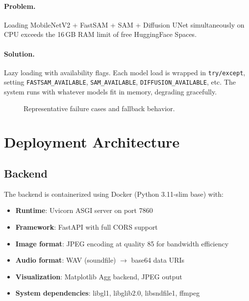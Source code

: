 \documentclass[11pt,a4paper,twocolumn]{article}
\begin{document}
\paragraph{Problem.} Loading MobileNetV2 + FastSAM + SAM + Diffusion UNet simultaneously on CPU exceeds the 16\,GB RAM limit of free HuggingFace Spaces.

\paragraph{Solution.} Lazy loading with availability flags. Each model load is wrapped in \texttt{try/except}, setting \texttt{FASTSAM\_AVAILABLE}, \texttt{SAM\_AVAILABLE}, \texttt{DIFFUSION\_AVAILABLE}, etc. The system runs with whatever models fit in memory, degrading gracefully.

\begin{figure}[H]
    \centering
    \caption{Representative failure cases and fallback behavior.}
    \label{fig:failures}
\end{figure}


\section{Deployment Architecture}
\label{sec:deployment}

\subsection{Backend}

The backend is containerized using Docker (Python 3.11-slim base) with:
\begin{itemize}[nosep]
    \item \textbf{Runtime}: Uvicorn ASGI server on port 7860
    \item \textbf{Framework}: FastAPI with full CORS support
    \item \textbf{Image format}: JPEG encoding at quality 85 for bandwidth efficiency
    \item \textbf{Audio format}: WAV (soundfile) $\to$ base64 data URIs
    \item \textbf{Visualization}: Matplotlib Agg backend, JPEG output
    \item \textbf{System dependencies}: libgl1, libglib2.0, libsndfile1, ffmpeg
\end{itemize}
\end{document}
